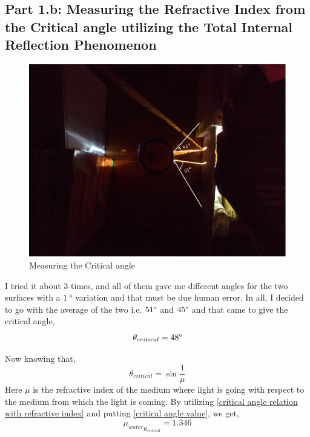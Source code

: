 \documentclass[twocolumn,11pt]{article}
\begin{document}
\subsection{Part 1.b: Measuring the Refractive Index from the Critical angle utilizing the Total Internal Reflection Phenomenon}
    \begin{figure}[H]
        \centering
        \includegraphics[scale =0.3]{TIR_double.png}
        \caption{Measuring the Critical angle}
        \label{Illustration of the Experimental procedure}
    \end{figure}
I tried it about 3 times, and all of them gave me different angles for the two surfaces with a $\SI{1}{\degree}$ variation and that must be due human error. In all, I decided to go with the average of the two i.e. $51\degree$ and $45\degree$ and that came to give the critical angle,
\begin{equation}
    \label{critical angle value}
    \theta_{critical} = 48 \degree
\end{equation}

Now knowing that,
\begin{equation}
    \label{critical angle relation with refractive index}
    \theta_{critical} = \sin{\frac{1}{\mu}}
\end{equation}
Here $\mu$ is the refractive index of the medium where light is going with respect to the medium from which the light is coming.
By utilizing \eqref{critical angle relation with refractive index} and putting \eqref{critical angle value}, we get,
\begin{equation}
    \label{Refractive index value using critical angle}
    {\mu_{water}}_{\theta_{critical}} = 1.346
\end{equation}
\end{document}

